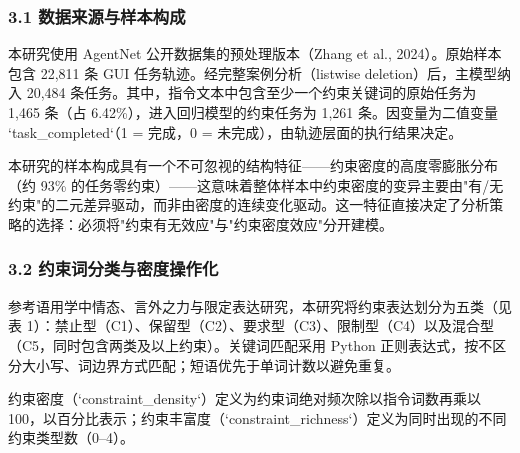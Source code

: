 \documentclass[12pt,a4paper,openany,oneside]{ctexrep}
\begin{document}
\subsubsection{3.1 数据来源与样本构成}


本研究使用 AgentNet 公开数据集的预处理版本（Zhang et al., 2024）。原始样本包含 22,811 条 GUI 任务轨迹。经完整案例分析（listwise deletion）后，主模型纳入 20,484 条任务。其中，指令文本中包含至少一个约束关键词的原始任务为 1,465 条（占 6.42\%），进入回归模型的约束任务为 1,261 条。因变量为二值变量 `task\_completed`（1 = 完成，0 = 未完成），由轨迹层面的执行结果决定。

本研究的样本构成具有一个不可忽视的结构特征——约束密度的高度零膨胀分布（约 93\% 的任务零约束）——这意味着整体样本中约束密度的变异主要由"有/无约束"的二元差异驱动，而非由密度的连续变化驱动。这一特征直接决定了分析策略的选择：必须将"约束有无效应"与"约束密度效应"分开建模。

\subsubsection{3.2 约束词分类与密度操作化}


参考语用学中情态、言外之力与限定表达研究，本研究将约束表达划分为五类（见表 1）：禁止型（C1）、保留型（C2）、要求型（C3）、限制型（C4）以及混合型（C5，同时包含两类及以上约束）。关键词匹配采用 Python 正则表达式，按不区分大小写、词边界方式匹配；短语优先于单词计数以避免重复。

约束密度（`constraint\_density`）定义为约束词绝对频次除以指令词数再乘以 100，以百分比表示；约束丰富度（`constraint\_richness`）定义为同时出现的不同约束类型数（0–4）。


\begin{table}[htbp]
\centering
\caption{表 1：约束表达的类型学定义与关键词}
\small
{}
\end{table}
\end{document}
